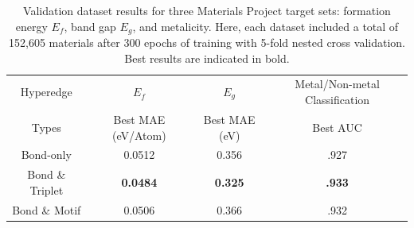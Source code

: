 \documentclass[twoside,twocolumn,9pt]{article}
\begin{document}
\begin{table}
	\begin{tabular*}{\textwidth}{@{\extracolsep{\fill}}cccc}
		\hline
		Hyperedge & $E_f$ & $E_g$ & Metal/Non-metal Classification \\
		Types & Best MAE (eV/Atom) & Best MAE (eV) & Best AUC \\
		\hline
		Bond-only & 0.0512 & 0.356 & .927 \\
		Bond \& Triplet &  \textbf{0.0484} & \textbf{0.325 } & \textbf{.933}\\
		Bond \& Motif &  0.0506 & 0.366 & .932\\
		\hline
	\end{tabular*}
	\caption{Validation dataset results for three Materials Project target sets: formation energy $E_f$, band gap $E_g$, and metalicity. Here, each dataset included a total of 152,605 materials after 300 epochs of training with 5-fold nested cross validation. Best results are indicated in bold.}\label{fig:mp_table}
\end{table}






\end{document}
